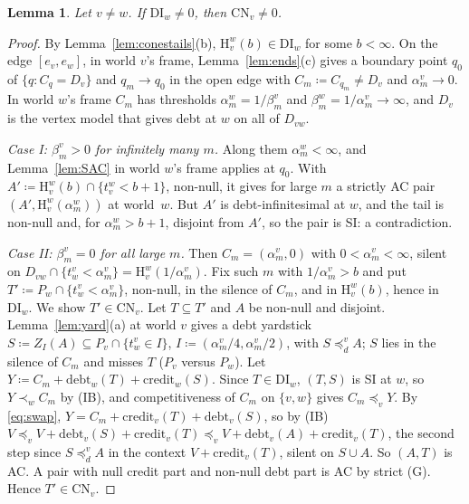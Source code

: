 \documentclass[11pt]{article}
\newtheorem{lemma}[theorem]{Lemma}
\theoremstyle{definition}\newtheorem{definition}[theorem]{Definition}
\theoremstyle{remark}\newtheorem{remark}[theorem]{Remark}
\newcommand{\debt}{\mathrm{debt}}
\newcommand{\cred}{\mathrm{credit}}
\newcommand{\Hi}[3]{\mathrm H^{#1}_{#2}(#3)}
\newcommand{\CN}{\mathrm{CN}}
\newcommand{\DI}{\mathrm{DI}}
\begin{document}
\begin{lemma}\label{lem:DItoCN}
Let $v\ne w$. If $\DI_w\ne0$, then $\CN_v\ne0$.
\end{lemma}
\begin{proof}
By Lemma~\ref{lem:conestails}(b), $\Hi wvb\in\DI_w$ for some $b<\infty$. On
the edge $[e_v,e_w]$, in world $v$'s frame, Lemma~\ref{lem:ends}(c) gives a
boundary point $q_0$ of $\{q:C_q=D_v\}$ and $q_m\to q_0$ in the open edge
with $C_m\coloneqq C_{q_m}\ne D_v$ and $\alpha^v_m\to0$. In world $w$'s
frame $C_m$ has thresholds $\alpha^w_m=1/\beta^v_m$ and
$\beta^w_m=1/\alpha^v_m\to\infty$, and $D_v$ is the vertex model that gives
debt at $w$ on all of $D_{vw}$.

\emph{Case I: $\beta^v_m>0$ for infinitely many $m$.} Along them
$\alpha^w_m<\infty$, and Lemma~\ref{lem:SAC} in world $w$'s frame applies at
$q_0$. With $A'\coloneqq\Hi wvb\cap\{t^w_v<b+1\}$, non-null, it gives for
large $m$ a strictly AC pair $(A',\Hi wv{\alpha^w_m})$ at world~$w$. But $A'$
is debt-infinitesimal at $w$, and the tail is non-null and, for
$\alpha^w_m>b+1$, disjoint from $A'$, so the pair is SI: a contradiction.

\emph{Case II: $\beta^v_m=0$ for all large $m$.} Then $C_m=(\alpha^v_m,0)$
with $0<\alpha^v_m<\infty$, silent on $D_{vw}\cap\{t^v_w<\alpha^v_m\}=
\Hi wv{1/\alpha^v_m}$. Fix such $m$ with $1/\alpha^v_m>b$ and put
$T'\coloneqq P_w\cap\{t^v_w<\alpha^v_m\}$, non-null, in the silence of $C_m$,
and in $\Hi wvb$, hence in $\DI_w$. We show $T'\in\CN_v$. Let $T\subseteq T'$
and $A$ be non-null and disjoint. Lemma~\ref{lem:yard}(a) at world $v$ gives
a debt yardstick $S\coloneqq Z_I(A)\subseteq P_v\cap\{t^v_w\in I\}$,
$I\coloneqq(\alpha^v_m/4,\alpha^v_m/2)$, with $S\preceq^v_dA$; $S$ lies in
the silence of $C_m$ and misses $T$ ($P_v$ versus $P_w$). Let
$Y\coloneqq C_m+\debt_w(T)+\cred_w(S)$. Since $T\in\DI_w$, $(T,S)$ is SI at
$w$, so $Y\prec_wC_m$ by (IB), and competitiveness of $C_m$ on $\{v,w\}$ gives
$C_m\preceq_vY$. By \eqref{eq:swap}, $Y=C_m+\cred_v(T)+\debt_v(S)$, so by
(IB) $V\preceq_vV+\debt_v(S)+\cred_v(T)\preceq_vV+\debt_v(A)+\cred_v(T)$, the
second step since $S\preceq^v_dA$ in the context $V+\cred_v(T)$, silent on
$S\cup A$. So $(A,T)$ is AC. A pair with null credit part and non-null debt
part is AC by strict (G). Hence $T'\in\CN_v$.
\end{proof}
\end{document}
